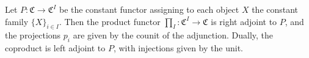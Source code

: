 Let $P : \mathfrak{C} \to \mathfrak{C}^I$ be the constant functor assigning to each object $X$ the constant family $\{X\}_{i \in I}$. Then the product functor $\prod_I : \mathfrak{C}^I \to \mathfrak{C}$ is right adjoint to $P$, and the projections $p_i$ are given by the counit of the adjunction. Dually, the coproduct is left adjoint to $P$, with injections given by the unit.
